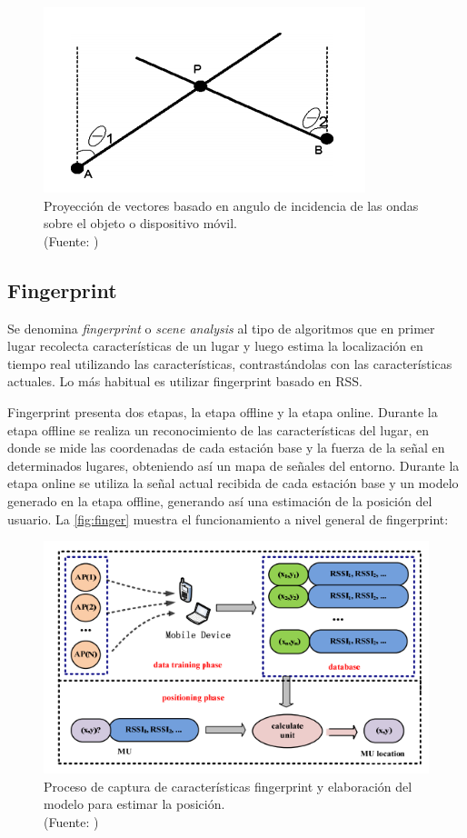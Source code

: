 \begin{enumerate}
\begin{enumerate}
\begin{figure}[ht!]
\centering
\includegraphics[width=.4\textwidth]{figures/angulacion.png}
\caption[abs]{Proyección de vectores basado en angulo de incidencia de las ondas sobre el objeto o dispositivo móvil.\\
{\scriptsize (Fuente: \citep{Liu:2007:SWI:2220431.2221077})}}
\label{fig:angulacion}
\end{figure}

\end{enumerate}
\end{enumerate}

\subsection{Fingerprint}

Se denomina \textit{fingerprint} o \textit{scene analysis} al tipo de algoritmos que en primer lugar recolecta características de un lugar y luego estima la localización en tiempo real utilizando las características, contrastándolas con las características actuales. Lo más habitual es utilizar fingerprint basado en RSS.

Fingerprint presenta dos etapas, la etapa offline y la etapa online. Durante la etapa offline se realiza un reconocimiento de las características del lugar, en donde se mide las coordenadas de cada estación base y la fuerza de la señal en determinados lugares, obteniendo así un mapa de señales del entorno.  Durante la etapa online se utiliza la señal actual recibida de cada estación base y un modelo generado en la etapa offline, generando así una estimación de la posición del usuario. La  \autoref{fig:finger} muestra el funcionamiento a nivel general de fingerprint:

\begin{figure}[ht!]
\centering
\includegraphics[width=.4\textwidth]{figures/finger.png}
\caption[abs]{Proceso de captura de características fingerprint y elaboración del modelo para estimar la posición.\\
{\scriptsize (Fuente: \citep{Liu:2007:SWI:2220431.2221077})}}
\label{fig:finger}
\end{figure}

